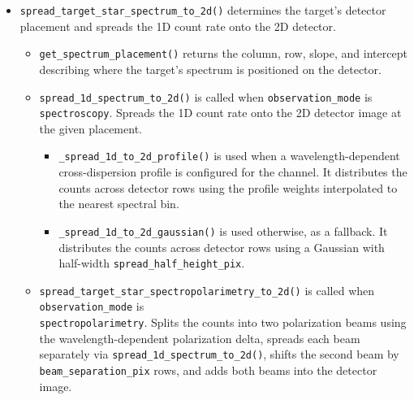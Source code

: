 \begin{itemize}
\begin{itemize}
          \end{itemize}
    \item \texttt{spread\_target\_star\_spectrum\_to\_2d()} determines the target's detector placement and spreads the 1D count rate onto the 2D detector.
          \begin{itemize}
              \item \texttt{get\_spectrum\_placement()} returns the column, row, slope, and intercept describing where the target's spectrum is positioned on the detector.
              \item \texttt{spread\_1d\_spectrum\_to\_2d()} is  called when \texttt{observation\_mode} is \texttt{spectroscopy}. Spreads the 1D count rate onto the 2D detector image at the given placement.
                    \begin{itemize}
                        \item \texttt{\_spread\_1d\_to\_2d\_profile()} is used when a wavelength-dependent cross-dispersion profile is configured for the channel. It distributes the counts across detector rows using the profile weights interpolated to the nearest spectral bin.
                        \item \texttt{\_spread\_1d\_to\_2d\_gaussian()} is used otherwise, as a fallback. It distributes the counts across detector rows using a Gaussian with half-width \texttt{spread\_half\_height\_pix}.
                    \end{itemize}
              \item \texttt{spread\_target\_star\_spectropolarimetry\_to\_2d()} is called when \texttt{observation\_mode} is \\ \texttt{spectropolarimetry}. Splits the counts into two polarization beams using the wavelength-dependent polarization delta, spreads each beam separately via \texttt{spread\_1d\_spectrum\_to\_2d()}, shifts the second beam by \texttt{beam\_separation\_pix} rows, and adds both beams into the detector image.
          \end{itemize}
\end{itemize}

